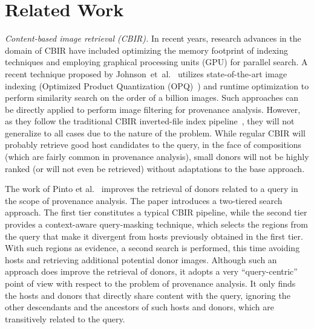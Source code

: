 \section{Related Work}
\label{sec:rw}


\textit{Content-based image retrieval (CBIR).} 
In recent years, research advances in the domain of CBIR have included optimizing the memory footprint of indexing techniques and employing graphical processing units (GPU) for parallel search.
A recent technique proposed by Johnson~et~al.~\cite{johnson2017billion} utilizes state-of-the-art image indexing (Optimized Product Quantization (OPQ)~\cite{ge2013optimized}) and runtime optimization to perform similarity search on the order of a billion images.
Such approaches can be directly applied to perform image filtering for provenance analysis. 
However, as they follow the traditional CBIR inverted-file index pipeline~\cite{Zisserman_2003}, they will not generalize to all cases due to the nature of the problem.
While regular CBIR will probably retrieve good host candidates to the query, in the face of compositions (which are fairly common in provenance analysis), small donors will not be highly ranked (or will not even be retrieved) without adaptations to the base approach.

The work of Pinto et al.~\cite{pinto2017filtering} improves the retrieval of donors related to a query in the scope of provenance analysis.
The paper introduces a two-tiered search approach. The first tier constitutes a typical CBIR pipeline, while the second tier provides a context-aware query-masking technique, which selects the regions from the query that make it divergent from hosts previously obtained in the first tier.
With such regions as evidence, a second search is performed, this time avoiding hosts and retrieving additional potential donor images.
Although such an approach does improve the retrieval of donors, it adopts a very ``query-centric'' point of view with respect to the problem of provenance analysis.
It only finds the hosts and donors that directly share content with the query, ignoring the other descendants and the ancestors of such hosts and donors, which are transitively related to the query.

